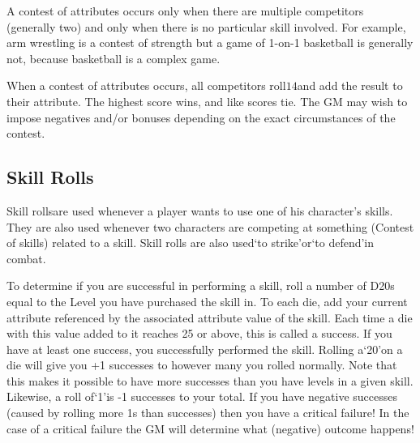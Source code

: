 \documentclass[twoside]{book}
\begin{document}
    {  
    A contest of attributes occurs only when there are multiple competitors (generally two) and only when there is no particular skill involved. For example, arm wrestling is a contest of strength but a game of 1-on-1 basketball is generally not, because basketball is a complex game.
    }
  
    {  
    When a contest of attributes occurs, all competitors roll\ensuremath{1}\ensuremath{4}\ensuremath{}and add the result to their attribute. The highest score wins, and like scores tie. The GM may wish to impose negatives and/or bonuses depending on the exact circumstances of the contest.
    }
  
  

  

  
    

\subsection{Skill Rolls}
    
    {  
    Skill rollsare used whenever a player wants to use one of his character's skills. They are also used whenever two characters are competing at something (Contest of skills) related to a skill. Skill rolls are also used`to strike'or`to defend'in combat.
    }
  
    {  
    To determine if you are successful in performing a skill, roll a number of D20s equal to the Level you have purchased the skill in. To each die, add your current attribute referenced by the associated attribute value of the skill. Each time a die with this value added to it reaches 25 or above, this is called a success. If you have at least one success, you successfully performed the skill. Rolling a`20'on a die will give you +1 successes to however many you rolled normally. Note that this makes it possible to have more successes than you have levels in a given skill. Likewise, a roll of`1'is -1 successes to your total. If you have negative successes (caused by rolling more 1s than successes) then you have a critical failure! In the case of a critical failure the GM will determine what (negative) outcome happens!
    }
  
\end{document}
